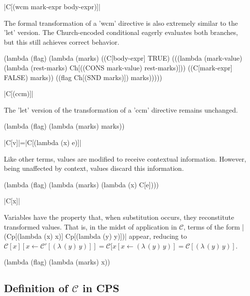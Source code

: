 \documentclass{llncs}
\newcommand{\abs}[2]{(\lambda\,(#1)\,#2)}
\newcommand{\C}[1]{\mathcal{C}[#1]}
\newcommand{\Cp}[1]{\mathcal{C}'[#1]}
\begin{document}
\begin{schemedefn}{\scheme|C[(wcm mark-expr body-expr)]|}

The formal transformation of a \scheme'wcm' directive is also extremely similar to the \scheme'let' version. The Church-encoded conditional eagerly evaluates both branches, but this still achieves correct behavior.
\begin{schemedisplay}
(lambda (flag)
  (lambda (marks)
    ((C[body-expr] TRUE)
     (((lambda (mark-value) (lambda (rest-marks) Ch[((CONS mark-value) rest-marks)]))
       ((C[mark-expr] FALSE) marks))
      ((flag Ch[(SND marks)]) marks)))))
\end{schemedisplay}
\end{schemedefn}

\begin{schemedefn}{\scheme|C[(ccm)]|}

The \scheme'let' version of the transformation of a \scheme'ccm' directive remains unchanged.
\begin{schemedisplay}
(lambda (flag)
  (lambda (marks)
    marks))
\end{schemedisplay}
\end{schemedefn}

\begin{schemedefn}{\scheme|C[v]|=\scheme|C[(lambda (x) e)]|}

Like other terms, values are modified to receive contextual information. However, being unaffected by context, values discard this information.
\begin{schemedisplay}
(lambda (flag)
  (lambda (marks)
    (lambda (x) C[e])))
\end{schemedisplay}
\end{schemedefn}


\begin{schemedefn}{\scheme|C[x]|}

Variables have the property that, when substitution occurs, they reconstitute transformed values. That is, in the midst of application in $\mathcal{C}$, terms of the form \scheme|(Cp[(lambda (x) x)] Cp[(lambda (y) y)])| appear, reducing to $\C{x}[x\leftarrow \Cp{\abs{y}{y}}]=\C{x[x\leftarrow\abs{y}{y}}=\C{\abs{y}{y}}$.
\begin{schemedisplay}
(lambda (flag)
  (lambda (marks)
    x))
\end{schemedisplay}
\end{schemedefn}

\subsection{Definition of $\mathcal{C}$ in CPS}
\end{document}
